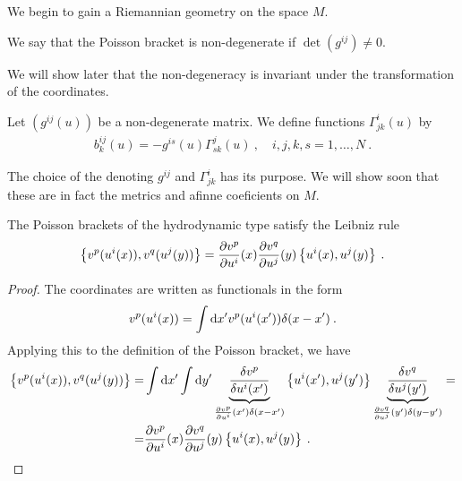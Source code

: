 We begin to gain a Riemannian geometry on the space $M$.

\begin{definition}
    We say that the Poisson bracket is non-degenerate if $\det(g^{ij}) \neq 0$.
\end{definition}

We will show later that the non-degeneracy is invariant under the transformation of the coordinates.

\begin{definition}
    Let $(g^{ij}(u))$ be a non-degenerate matrix. We define functions $\Gamma^{i}_{jk}(u)$ by
        \begin{align}
            b_k^{ij}(u) = -g^{is}(u) \Gamma^j_{sk}(u) \:, \quad i,j,k,s=1,\dots,N \:. \label{eq:definice-Gamma}
        \end{align}
\end{definition}

The choice of the denoting $g^{ij}$ and $\Gamma^{i}_{jk}$ has its purpose. We will show soon that these are in fact the metrics and afinne coeficients on $M$.

\begin{proposition}
    The Poisson brackets of the hydrodynamic type satisfy the Leibniz rule
    \begin{align}
        \label{eq:transformace-zavorka}
        \left \lbrace v^p(u^i(x)),v^q(u^j(y)) \right \rbrace = \frac{\partial v^p}{\partial u^i}(x) \frac{\partial v^q}{\partial u^j}(y) \left \lbrace u^i(x),u^j(y) \right \rbrace \:. 
    \end{align}
\end{proposition}
\begin{proof}
    The coordinates are written as functionals in the form
    \begin{align}
        v^p(u^i(x)) = \int \mathrm{d} x' v^p(u^i(x')) \delta (x-x') \:.
    \end{align}
    Applying this to the definition of the Poisson bracket, we have
    \begin{align}
        \left \lbrace v^p(u^i(x)),v^q(u^j(y)) \right \rbrace 
        =& \int \mathrm{d} x' \int \mathrm{d} y' \underbrace{\frac{\delta v^p}{\delta u^i(x')} }_{\frac{\partial v^p}{\partial u^i}(x') \delta(x-x')} \left \lbrace u^i(x'),u^j(y') \right \rbrace \underbrace{\frac{\delta v^q}{\delta u^j(y')} }_{\frac{\partial v^q}{\partial u^j}(y') \delta(y-y')}
        = \\ =& \frac{\partial v^p}{\partial u^i}(x) \frac{\partial v^q}{\partial u^j}(y) \left \lbrace u^i(x),u^j(y) \right \rbrace \:.
    \end{align}
\end{proof}


